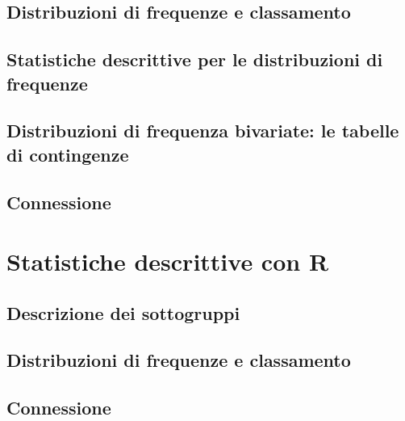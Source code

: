 \documentclass[a4paper,12pt,oneside]{book}
\begin{document}
\hypertarget{distribuzioni-di-frequenze-e-classamento}{%
\subsection{Distribuzioni di frequenze e classamento}\label{distribuzioni-di-frequenze-e-classamento}}

\hypertarget{statistiche-descrittive-per-le-distribuzioni-di-frequenze}{%
\subsection{Statistiche descrittive per le distribuzioni di frequenze}\label{statistiche-descrittive-per-le-distribuzioni-di-frequenze}}

\hypertarget{distribuzioni-di-frequenza-bivariate-le-tabelle-di-contingenze}{%
\subsection{Distribuzioni di frequenza bivariate: le tabelle di contingenze}\label{distribuzioni-di-frequenza-bivariate-le-tabelle-di-contingenze}}

\hypertarget{connessione}{%
\subsection{Connessione}\label{connessione}}

\hypertarget{statistiche-descrittive-con-r}{%
\section{Statistiche descrittive con R}\label{statistiche-descrittive-con-r}}

\hypertarget{descrizione-dei-sottogruppi}{%
\subsection{Descrizione dei sottogruppi}\label{descrizione-dei-sottogruppi}}

\hypertarget{distribuzioni-di-frequenze-e-classamento-1}{%
\subsection{Distribuzioni di frequenze e classamento}\label{distribuzioni-di-frequenze-e-classamento-1}}

\hypertarget{connessione-1}{%
\subsection{Connessione}\label{connessione-1}}
\end{document}
